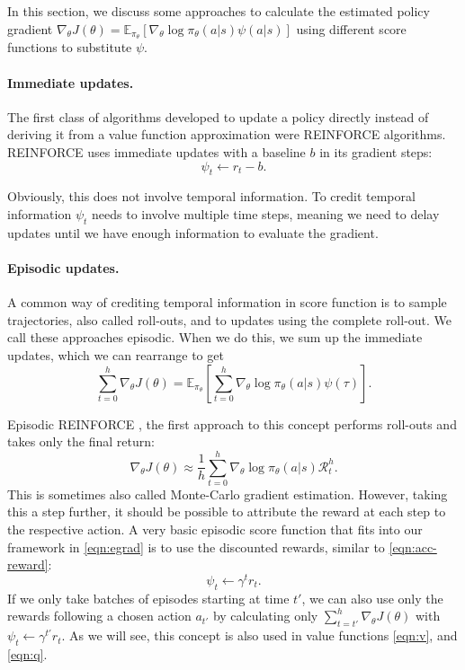 In this section, we discuss some approaches to calculate the estimated policy gradient $\nabla_\theta J(\theta) = \mathbb{E}_{\pi_\theta}\left[\nabla_\theta{\log\pi_\theta(a|s)}\psi(a|s)\right]$ using different score functions to substitute $\psi$.

\paragraph{Immediate updates.} The first class of algorithms developed to update a policy directly instead of deriving it from a value function approximation were REINFORCE \cite{Williams92simplestatistical} algorithms. REINFORCE uses immediate updates with a baseline $b$ in its gradient steps:
\begin{equation}
  \psi_t \leftarrow r_t-b.
\end{equation}

Obviously, this does not involve temporal information. To credit temporal information $\psi_t$ needs to involve multiple time steps, meaning we need to delay updates until we have enough information to evaluate the gradient.

\paragraph{Episodic updates.} A common way of crediting temporal information in score function is to sample trajectories, also called roll-outs, and to updates using the complete roll-out. We call these approaches episodic. When we do this, we sum up the immediate updates, which we can rearrange to get
\begin{equation}
  \sum_{t=0}^h \nabla_\theta J(\theta) = \mathbb{E}_{\pi_\theta}\left[\sum_{t=0}^h \nabla_\theta{\log\pi_\theta(a|s)}\psi(\tau)\right].
  \label{eqn:egrad}
\end{equation}

Episodic REINFORCE \cite{Williams92simplestatistical}, the first approach to this concept performs roll-outs and takes only the final return:
\begin{equation}
  \nabla_\theta J(\theta) \approx \frac{1}{h} \sum_{t=0}^h \nabla_\theta\log\pi_\theta(a|s) \mathcal{R}_t^h.
\end{equation}
This is sometimes also called Monte-Carlo gradient estimation. However, taking this a step further, it should be possible to attribute the reward at each step to the respective action. A very basic episodic score function that fits into our framework in \eqref{eqn:egrad} is to use the discounted rewards, similar to \eqref{eqn:acc-reward}:
\begin{equation}
  \psi_t \leftarrow \gamma^t r_t.
\end{equation}
If we only take batches of episodes starting at time $t'$, we can also use only the rewards following a chosen action $a_{t'}$ by calculating only $\sum_{t=t'}^h \nabla_\theta J(\theta)$ with $\psi_t \leftarrow \gamma^{t'} r_{t}$. As we will see, this concept is also used in value functions \eqref{eqn:v}, and \eqref{eqn:q}.


